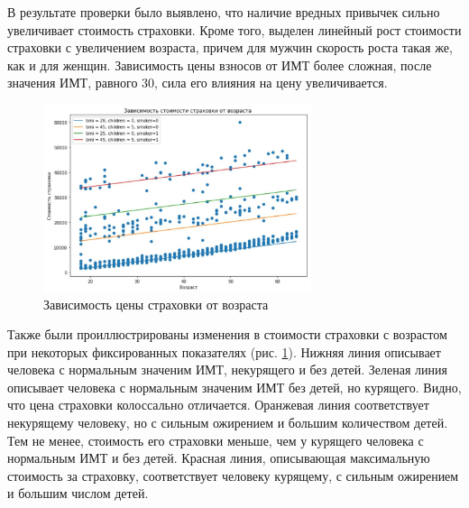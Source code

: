 \documentclass[a4paper,12pt]{article}
\begin{document}
В результате проверки было выявлено, что наличие вредных привычек сильно увеличивает стоимость страховки. Кроме того, выделен линейный рост стоимости страховки с увеличением возраста, причем для мужчин скорость роста такая же, как и для женщин. Зависимость цены взносов от ИМТ более сложная, после значения ИМТ, равного 30, сила его влияния на цену увеличивается.

\begin{figure}[H]
	\includegraphics[width=0.7\textwidth]{../[graphics]/example.jpg}
	\centering
	\caption{Зависимость цены страховки от возраста}
	\label{fig:example}
\end{figure}

Также были проиллюстрированы изменения в стоимости страховки с возрастом при некоторых фиксированных показателях (рис. \ref{fig:example}). Нижняя линия описывает человека с нормальным значеним ИМТ, некурящего и без детей. Зеленая линия описывает человека с нормальным значеним ИМТ без детей, но курящего. Видно, что цена страховки колоссально отличается. Оранжевая линия соответствует некурящему человеку, но с сильным ожирением и большим количеством детей. Тем не менее, стоимость его страховки меньше, чем у курящего человека с нормальным ИМТ и без детей. Красная линия, описывающая максимальную стоимость за страховку, соответствует человеку курящему, с сильным ожирением и большим числом детей.
\end{document}
